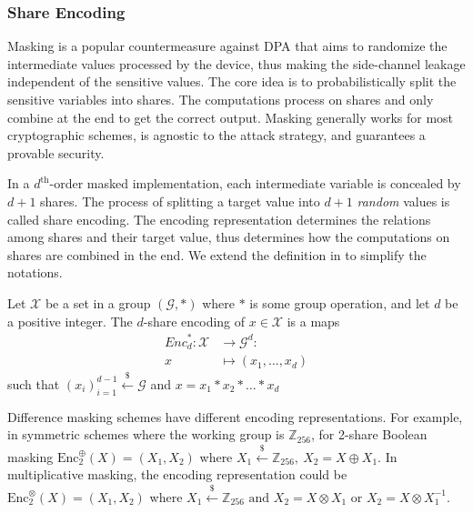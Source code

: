 \documentclass{llncs}
\begin{document}
	
	
	\subsubsection{Share Encoding}
	
	
	Masking is a popular countermeasure against DPA that aims to randomize the intermediate values processed by the device, thus making the side-channel leakage independent of the sensitive values. The core idea is to probabilistically split the sensitive variables into shares. The computations process on shares and only combine at the end to get the correct output. Masking generally works for most cryptographic schemes, is agnostic to the attack strategy, and guarantees a provable security.
	
	
	In a $d^{\text{th}}$-order masked implementation, each intermediate variable is concealed by $d + 1$ shares. The process of splitting a target value into $d+1$ \textit{random} values is called share encoding. The encoding representation determines the relations among shares and their target value, thus determines how the computations on shares are combined in the end. We extend the definition in \cite{Prouff13} to simplify the notations.
	\begin{definition}
		Let $\mathcal{X}$ be a set in a group $(\mathcal{G}, \ast)$ where $\ast$ is some group operation, and let $d$ be a positive integer. The $d$-share encoding of $x \in \mathcal{X}$ is a maps
		\begin{align*} 
			{Enc}^{\ast}_{d}: \mathcal{X} &\rightarrow \mathcal{G}^d:\\ 
			x &\mapsto ( x_1, \dots, x_d)
		\end{align*}
		such that $(x_i)_{i=1}^{d-1} \overset{\$}{\leftarrow} \mathcal{G}$ and $x = x_1 \ast x_2 \ast \dots \ast x_d$	
	\end{definition}
	Difference masking schemes have different encoding representations. For example, in symmetric schemes where the working group is $\mathbb{Z}_{256}$, for 2-share Boolean masking $\text{Enc}^{\oplus}_{2}(X) = (X_1, X_2)$ where $X_1 \overset{\$}{\leftarrow} \mathbb{Z}_{256},\ X_2 = X \oplus X_1$. In multiplicative masking, the encoding representation could be $\text{Enc}^{\otimes}_{2}(X) = (X_1, X_2)$ where $X_1 \overset{\$}{\leftarrow} \mathbb{Z}_{256} \text{ and } X_2 = X \otimes X_1 \text{ or } X_2 = X \otimes X_1^{-1}$.
	
\end{document}
